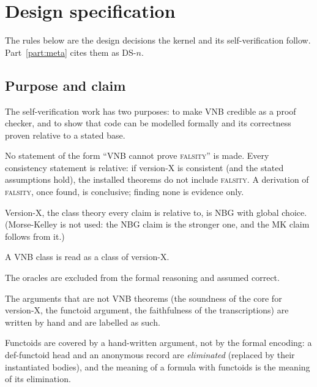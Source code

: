 \chapter{Design specification}\label{app:design-spec}

The rules below are the design decisions the kernel and its self-verification follow.
Part~\ref{part:meta} cites them as DS-$n$.

\section*{Purpose and claim}
\begin{description}[style=nextline,leftmargin=1.4cm]
\item[DS-1]\label{ds:1} The self-verification work has two purposes: to make VNB credible as a proof checker, and to show that code can be modelled formally and its correctness proven relative to a stated base.
\item[DS-2]\label{ds:2} No statement of the form ``VNB cannot prove \textsc{falsity}'' is made. Every consistency statement is relative: if version-X is consistent (and the stated assumptions hold), the installed theorems do not include \textsc{falsity}. A derivation of \textsc{falsity}, once found, is conclusive; finding none is evidence only.
\item[DS-3]\label{ds:3} Version-X, the class theory every claim is relative to, is NBG with global choice. (Morse-Kelley is not used: the NBG claim is the stronger one, and the MK claim follows from it.)
\item[DS-4]\label{ds:4} A VNB class is read as a class of version-X.
\item[DS-5]\label{ds:5} The oracles are excluded from the formal reasoning and assumed correct.
\item[DS-6]\label{ds:6} The arguments that are not VNB theorems (the soundness of the core for version-X, the functoid argument, the faithfulness of the transcriptions) are written by hand and are labelled as such.
\item[DS-7]\label{ds:7} Functoids are covered by a hand-written argument, not by the formal encoding: a def-functoid head and an anonymous record are \emph{eliminated} (replaced by their instantiated bodies), and the meaning of a formula with functoids is the meaning of its elimination.
\end{description}
